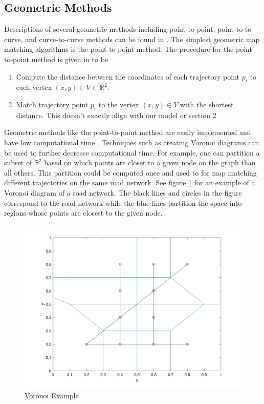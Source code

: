 \documentclass{article}
\numberwithin{equation}{section}
\theoremstyle{definition}
\begin{document}
\subsection{Geometric Methods}
Descriptions of several geometric methods including point-to-point, point-to-to curve, and curve-to-curve methods can be found in \cite{BK}. The simplest geometric map matching algorithms is the point-to-point method. The procedure for the point-to-point method is given in \cite{BK} to be
\begin{enumerate}
\item Compute the distance between the coordinates of each trajectory point $p_i$ to each vertex $(x,y)\in V\subset \mathbb{R}^2$.
\item Match trajectory point $p_i$ to the vertex $(x,y)\in V$ with the shortest distance. 
{\color{red} This doesn't exactly align with our model or section 2} 
\end{enumerate}
Geometric methods like the point-to-point method are easily implemented and have low computational time \cite{BK}. Techniques such as creating Voronoi diagrams can be used to further decrease computational time. For example, one can partition a subset of $\mathbb{R}^{2}$ based on which points are closer to a given node on the graph than all others. This partition could be computed once and used to for map matching different trajectories on the same road network. See figure \ref{voronoi} for an example of a Voronoi diagram of a road network. The black lines and circles in the figure correspond to the road network while the blue lines partition the space into regions whose points are closest to the given node.
\begin{figure}[h!]
    \centering
    \includegraphics[scale=.25]{Voronoi.png}
    \caption{Voronoi Example}
    \label{voronoi}
\end{figure}
\end{document}
